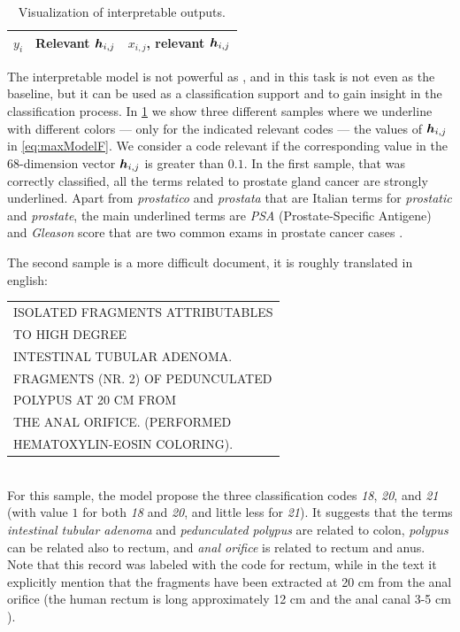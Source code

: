 \begin{table}
  \centering
  \ttfamily
  \scriptsize
  \caption{Visualization of interpretable outputs.}
  \label{tab:multiAttention1}
  \begin{tabular}{|c|c|c|}
    \hline
    $y_i$&\textrm{Relevant} $\bm{h}_{i,j}$&$x_{i,j}$\textrm{, relevant} $\bm{h}_{i,j}$\\
    \hline
    
    \hline
    
    \hline
    
    \hline
  \end{tabular}
\end{table}
The interpretable model is not powerful as \maxb{}, and in this task
is not even as the baseline, but it can be used as a
classification support and to 
gain insight in the classification process. In
\cref{tab:multiAttention1} we show three different samples where we
underline with different colors --- only for the indicated relevant
codes --- the values of $\bm{h}_{i,j}$ in \eqref{eq:maxModelF}. We
consider a code relevant if the corresponding value in the
68-dimension vector $\bm{h}_{i,j}$ is greater than $0.1$. In the
first sample, that was correctly classified, all the terms related to
prostate gland cancer are strongly underlined. Apart from
\emph{prostatico} and \emph{prostata} that are Italian terms for
\emph{prostatic} and \emph{prostate}, the main underlined terms are
\emph{PSA} (Prostate-Specific Antigene) and \emph{Gleason} score that
are two common exams in prostate cancer cases
\cite{brimo2013prostate}.

The second sample is a more difficult
document, it is roughly translated in english:\\
\begin{small}
  \ttfamily
  \begin{tabular}{l}
    ISOLATED FRAGMENTS ATTRIBUTABLES\\
    TO HIGH DEGREE\\
    INTESTINAL TUBULAR ADENOMA.\\
    FRAGMENTS (NR. 2) OF PEDUNCULATED\\
    POLYPUS AT 20 CM FROM\\
    THE ANAL ORIFICE. (PERFORMED\\
    HEMATOXYLIN-EOSIN COLORING).
\end{tabular}
\end{small}\\
For this sample, the model propose the three classification codes \emph{18},
\emph{20}, and \emph{21} (with value $1$ for both \emph{18} and
\emph{20}, and little less for \emph{21}). It suggests that the terms
\emph{intestinal tubular adenoma} and \emph{pedunculated polypus} are
related to colon, \emph{polypus} can be related also to rectum, and
\emph{anal orifice} is related to rectum and anus. Note that this
record was labeled with the code for rectum, while in the text it
explicitly mention that the fragments have been extracted at 20 cm
from the anal orifice (the human rectum is long approximately 12 cm
and the anal canal 3-5 cm \cite{greene2006ajcc}).

